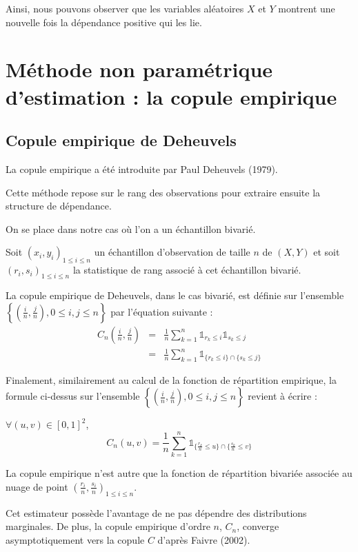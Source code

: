 Ainsi, nous pouvons observer que les variables aléatoires $X$ et $Y$ montrent une nouvelle fois la dépendance positive qui les lie.

\section{Méthode non paramétrique d'estimation : la copule empirique}

\subsection{Copule empirique de Deheuvels}

La copule empirique a été introduite par Paul Deheuvels (1979). 

Cette méthode repose sur le rang des observations pour extraire ensuite la
structure de dépendance.

On se place dans notre cas où l'on a un échantillon bivarié.

Soit $(x_i,y_i)_{1 \leq i \leq n}$ un échantillon d'observation de taille $n$ de $(X,Y)$ 
et soit $(r_i,s_i)_{1 \leq i \leq n}$ la statistique de rang associé à cet échantillon bivarié.

La copule empirique de Deheuvels, dans le cas bivarié, est définie sur l'ensemble $\left \{ \left( \frac{i}{n} , \frac{j}{n} \right) , 0 \leq i,j \leq n   \right \}$ 
par l'équation suivante :
\begin{eqnarray*}
C_n \left( \frac{i}{n},\frac{j}{n}\right) &=& \frac{1}{n} \sum_{k=1}^n \mathbb{1}_{r_k \leq i} \mathbb{1}_{s_k \leq j} \\
 &=& \frac{1}{n} \sum_{k=1}^n \mathbb{1}_{ \{r_k \leq i\} \cap \{ s_k \leq j\} } 
\end{eqnarray*}

Finalement, similairement au calcul de la fonction de répartition empirique, la formule ci-dessus sur l'ensemble $\left \{ \left( \frac{i}{n} , \frac{j}{n} \right) , 0 \leq i,j \leq n   \right \}$ revient à écrire :

$\forall (u,v) \in [0,1]^2$,
$$
C_n(u,v) = \frac{1}{n} \sum_{k=1}^n \mathbb{1}_{ \{ \frac{r_k}{n} \leq u\} \cap \{ \frac{s_k}{n} \leq v\} } 
$$

La copule empirique n’est autre que la fonction de répartition bivariée associée au nuage de point $\left( \frac{r_i}{n},\frac{s_i}{n} \right )_{1 \leq i \leq n}$.

Cet estimateur possède l'avantage de ne pas dépendre des distributions marginales. De plus, la copule
empirique d'ordre $n$, $C_n$, converge asymptotiquement vers la copule $C$ d'après Faivre (2002).

